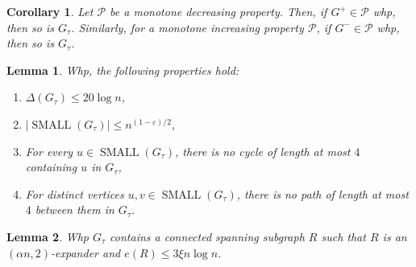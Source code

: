 \documentclass[10pt,a4paper]{amsart}
\newtheorem{corollary}{Corollary}
\newtheorem{lemma}{Lemma}
\newcommand{\SMA}{\operatorname{SMALL}}
\def\calP{\mathcal{P}}
\newcommand{\eps}{\varepsilon}
\begin{document}
\begin{corollary}\label{cor:monotonicity}
    Let $\calP$ be a monotone decreasing property. Then, if $G^+\in \calP$ whp, then so is $G_\tau$. Similarly, for a monotone increasing property $\calP$, if $G^-\in \calP$ whp, then so is $G_\tau$.
\end{corollary}

\begin{lemma}\label{lem:small-property}
        Whp, the following properties hold:
        \begin{enumerate}
            \item $\Delta(G_\tau)\leq 20\log n$,
            \item $|\SMA(G_\tau)|\leq n^{(1-\eps)/2}$,
            \item For every $u\in \SMA(G_\tau)$, there is no cycle of length at most $4$ containing $u$ in $G_\tau$,
            \item For distinct vertices $u,v\in \SMA(G_\tau)$, there is no path of length at most $4$ between them in $G_\tau$.
        \end{enumerate}
    \end{lemma}

\begin{lemma}\label{lem:sparse-expander-exists}
    Whp $G_\tau$ contains a connected spanning subgraph $R$ such that $R$ is an $(\alpha n,2)$-expander and $e(R)\leq 3 \xi n \log n$.
\end{lemma}
\end{document}
